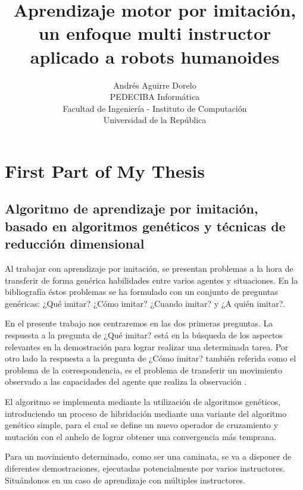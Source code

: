 \documentclass[
  twoside,
  11pt, a4paper,
  footinclude=true,
  headinclude=true,
  cleardoublepage=empty
]{scrbook}
\title{Aprendizaje motor por imitación, un enfoque multi instructor aplicado a  robots humanoides}
\author{Andrés Aguirre Dorelo\\ PEDECIBA Informática \\Facultad de Ingeniería - Instituto de Computación \\ Universidad de la República}
\begin{document}
\maketitle











\part{First Part of My Thesis}

\chapter{Algoritmo de aprendizaje por imitación, basado en algoritmos genéticos y técnicas de reducción dimensional}

Al trabajar con aprendizaje por imitación, se presentan problemas a la hora de transferir de forma genérica habilidades entre varios agentes y situaciones. En la bibliografía éstos problemas se ha formulado con un conjunto de preguntas genéricas: ¿Qué imitar? ¿Cómo imitar? ¿Cuando imitar? y ¿A quién imitar?\cite{Billard08chapter}.

En el presente trabajo nos centraremos en las dos primeras preguntas. La respuesta a la pregunta de ¿Qué imitar? está en la búsqueda de los aspectos relevantes en la demostración para lograr realizar una determinada tarea. Por otro lado la respuesta a la pregunta de ¿Cómo imitar? también referida como el problema de la correspondencia\cite{1158965}, es el problema de transferir un movimiento observado a las capacidades del agente que realiza la observación \cite{Calinon05goal-directedimitation}.

El algoritmo se implementa mediante la utilización de algoritmos genéticos, introduciendo un proceso de hibridación\cite{700115}\cite{Sumathi:2008:EII:1628817} mediante una variante del algoritmo genético simple, para el cual se define un nuevo operador de cruzamiento y mutación con el anhelo de lograr obtener una convergencia más temprana.

Para un movimiento determinado, como ser una caminata, se va a disponer de diferentes demostraciones, ejecutadas potencialmente por varios instructores. Situándonos en un caso de aprendizaje con múltiples instructores.
\end{document}
